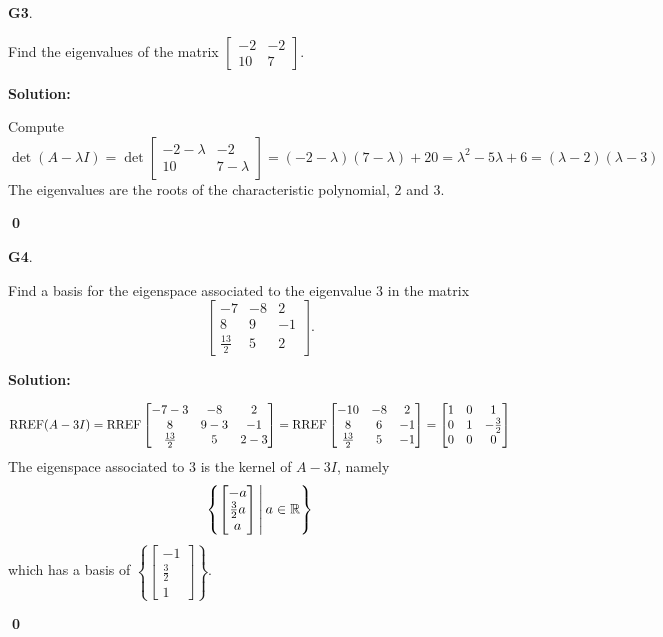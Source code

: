 \documentclass{article}
\newenvironment{problem}[1]
{
  \begin{flushleft}
  \textbf{#1}.
  \ignorespaces
}
{
  \end{flushleft}
}
\newenvironment{solution}
{
  \ignorespaces
  \textbf{Solution:}
}
{
  \ignorespacesafterend
  \begin{flushright}
  {\bfseries \qed}
  \end{flushright}
}
\begin{document}
\begin{problem}{G3}
Find the eigenvalues of the matrix \(\begin{bmatrix} -2 & -2 \\ 10 & 7 \end{bmatrix} \).
\end{problem}
\begin{solution}
Compute
\[\det(A-\lambda I) = \det \begin{bmatrix} -2 - \lambda & -2 \\ 10 & 7-\lambda \end{bmatrix} = (-2-\lambda)(7-\lambda)+20 = \lambda ^2 -5\lambda +6 = (\lambda -2)(\lambda -3)\]
The eigenvalues are the roots of the characteristic polynomial, $2$ and $3$.
\end{solution}

\begin{problem}{G4}
Find a basis for the eigenspace associated to the eigenvalue $3$ in the matrix \[\begin{bmatrix} -7 & -8 & 2 \\ 8 & 9 & -1 \\ \frac{13}{2} & 5 & 2 \end{bmatrix}.\]
\end{problem}
\begin{solution}
\[\operatorname{RREF}(A-3I) = \operatorname{RREF} \begin{bmatrix} -7-3 & -8 & 2 \\ 8 & 9-3 & -1 \\ \frac{13}{2} & 5 & 2-3 \end{bmatrix} = \operatorname{RREF} \begin{bmatrix} -10 & -8 & 2 \\ 8 & 6 & -1 \\ \frac{13}{2} & 5 & -1 \end{bmatrix} = \begin{bmatrix} 1 & 0 & 1 \\ 0 & 1 & -\frac{3}{2} \\ 0 & 0 & 0 \end{bmatrix}\]
The eigenspace associated to $3$ is the kernel of $A-3I$, namely  \[\left\{\begin{bmatrix} -a \\ \frac{3}{2} a \\ a \end{bmatrix}\,\middle|\,a \in \mathbb{R}\right\}\]
which has a basis of \(\left\{ \begin{bmatrix} -1 \\ \frac{3}{2} \\ 1 \end{bmatrix} \right\}\).
\end{solution}
\end{document}
